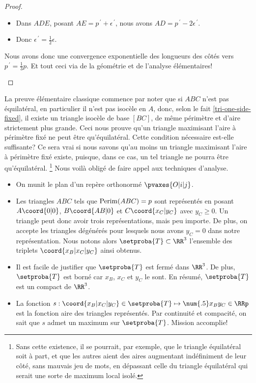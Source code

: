 \begin{proof}
\begin{enumerate}
\begin{itemize}
			\item Dans $ADE$, posant $AE = p^{\,\prime} + \epsilon^{\,\prime}$, nous avons $AD = p^{\,\prime} - 2 \epsilon^{\,\prime}$.

			\item Donc $\epsilon^{\,\prime} = \frac12 \epsilon$.
		\end{itemize}
		
		\noindent
		Nous avons donc une convergence exponentielle des longueurs des côtés vers $p^{\,\prime} = \frac13 p$. Et tout ceci via de la géométrie et de l'analyse élémentaires!
	\end{enumerate}
\end{proof}




\begin{remark}
	La preuve élémentaire classique commence par noter que si $ABC$ n'est pas équilatéral, en particulier il n'est pas isocèle en $A$, donc, selon le fait \ref{tri-one-side-fixed}, il existe un triangle isocèle de base $[BC]$, de même périmètre et d'aire strictement plus grande.
	Ceci nous prouve qu'un triangle maximisant l'aire à périmètre fixé ne peut être qu'équilatéral. 
	Cette condition nécessaire est-elle suffisante? Ce sera vrai si nous savons qu'au moins un triangle maximisant l'aire à périmètre fixé existe, puisque, dans ce cas, un tel triangle ne pourra être qu'équilatéral.%
	\footnote{
		Sans cette existence, il se pourrait, par exemple, que le triangle équilatéral soit à part, et que les autres aient des aires augmentant indéfiniment de leur côté, sans mauvais jeu de mots, en dépassant celle du triangle équilatéral qui serait une sorte de maximum local isolé.
	}
	Nous voilà obligé de faire appel aux techniques d'analyse.
	\begin{itemize}
		\item On munit le plan d'un repère orthonormé $\pvaxes{O | i | j}$. 

		\item Les triangles $ABC$ tels que $\mathrm{Perim}(ABC) = p$ sont représentés en posant $A\coord{0 | 0}$, $B\coord{AB | 0}$ et $C\coord{x_C | y_C}$ avec $y_C \geq 0$. Un triangle peut donc avoir trois représentations, mais peu importe.
		De plus, on accepte les triangles dégénérés pour lesquels nous avons $y_C = 0$ dans notre représentation.
		Nous notons alors $\setproba{T} \subset \RR^3$ l'ensemble des triplets $\coord{x_B | x_C | y_C}$ ainsi obtenus.

		\item Il est facile de justifier que $\setproba{T}$ est fermé dans $\RR^3$.
		De plus, $\setproba{T}$ est borné car $x_B$, $x_C$ et $y_C$ le sont.
		En résumé, $\setproba{T}$ est un compact de $\RR^3$.

		\item La fonction $s: \coord{x_B | x_C | y_C} \in \setproba{T} \mapsto \num{.5} x_B y_C \in \RRp$ est la fonction aire des triangles représentés.
		Par continuité et compacité, on sait que $s$ admet un maximum sur $\setproba{T}$. Mission accomplie!
	\end{itemize}
\end{remark}


